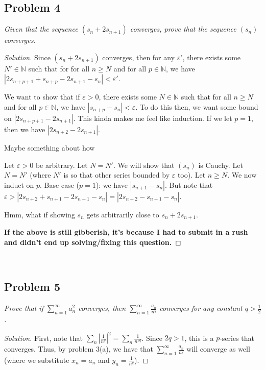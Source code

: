 \documentclass{article}
\newcommand{\N}{{\mathbb N}}
\newcommand{\ep}{{\varepsilon}}
\begin{document}
\subsection*{Problem 4}
{\it Given that the sequence $(s_n + 2s_{n+1})$ converges,
prove that the sequence $(s_n)$ converges.}
\begin{proof}[Solution]\let\qed\relax
	Since $(s_n + 2s_{n+1})$ converges,
	then for any $\ep'$, there exists some $N' \in \N$
	such that for for all $n \geq N$ and for all $p \in \N$,
	we have $|2s_{n+p+1} + s_{n+p} - 2s_{n+1} - s_n| < \ep'$.

	We want to show that if $\ep > 0$,
	there exists some $N \in \N$ such that
	for all $n \geq N$ and for all $p \in \N$,
	we have $|s_{n+p} - s_n| < \ep$.
	To do this then, we want some bound on $|2s_{n+p+1} - 2s_{n+1}|$.
	This kinda makes me feel like induction.
	If we let $p = 1$, then we have $|2s_{n+2} - 2s_{n+1}|$.

	Maybe something about how 

	Let $\ep > 0$ be arbitrary.
	Let $N = N'$.
	We will show that $(s_n)$ is Cauchy.
	Let $N = N'$ (where $N'$ is so that other series bounded by $\ep$ too).
	Let $n \geq N$. We now induct on $p$.
	Base case ($p = 1$):
	we have $|s_{n+1} - s_n|$.
	But note that $\ep > |2s_{n+2} + s_{n+1} - 2s_{n+1} - s_n|
	= |2s_{n+2} - s_{n+1} - s_n|$.

	Hmm, what if showing $s_n$ gets arbitrarily close to $s_n + 2s_{n+1}$.

	\textbf{If the above is still gibberish, it's because I had to submit
	in a rush and didn't end up solving/fixing this question.}
\end{proof}
\clearpage
~\clearpage

\subsection*{Problem 5}
{\it Prove that if $\sum^\infty_{n=1}a^2_n$ converges,
then $\sum_{n=1}^\infty \frac{a_n}{n^q}$
converges for any constant $q > \frac{1}{2}$.}

\begin{proof}[Solution]\let\qed\relax
	First, note that $\sum_{n}|\frac{1}{n^q}|^2 = \sum_n \frac{1}{n^{2q}}$.
	Since $2q > 1$, this is a $p$-series that converges.
	Thus, by problem 3(a), we have that
	$\sum_{n=1}^\infty \frac{a_n}{n^q}$ will converge as well
	(where  we substitute $x_n = a_n$ and $y_n = \frac{1}{n^q}$).
\end{proof} 
\clearpage
~\clearpage
\end{document}
